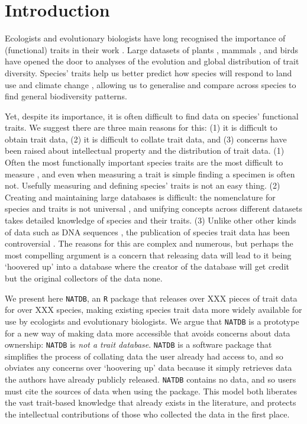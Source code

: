 \documentclass[12pt]{report}
\newcommand{\R}{\texttt{R}\xspace}
\newcommand{\natdb}{\texttt{NATDB}\xspace}
\begin{document}
\section{Introduction}
Ecologists and evolutionary biologists have long recognised the
importance of (functional) traits in their work
\autocite{Diaz2001}. Large datasets of plants \autocite{Kattge2011},
mammals \autocite{Jones2009}, and birds \autocite{Wilman2014} have
opened the door to analyses of the evolution \autocite{Harmon2010} and
global distribution \autocite{Kattge2011} of trait diversity.
Species' traits help us better predict how species will respond to
land use \autocite{Mayfield2010a} and climate change
\autocite{Estrada2016}, allowing us to generalise and compare across
species to find general biodiversity patterns. 

Yet, despite its importance, it is often difficult to find data on
species' functional traits. We suggest there are three main reasons for
this: (1) it is difficult to obtain trait data, (2) it is difficult to
collate trait data, and (3) concerns have been raised about
intellectual property and the distribution of trait data. (1) Often
the most functionally important species traits are the most difficult
to measure \autocite{Cornelissen2003,Violle2007}, and even when
measuring a trait is simple finding a specimen is often not. Usefully
measuring and defining species' traits is not an easy thing. (2)
Creating and maintaining large databases is difficult: the
nomenclature for species and traits is not universal
\autocite{Kattge2011,Hudson2017}, and unifying concepts across
different datasets takes detailed knowledge of species and their
traits. (3) Unlike other other kinds of data such as DNA sequences
\autocite{Benson2013}, the publication of species trait data has been
controversial \autocite[\emph{e.g.},][]{Poisot2014,Moles2013}.
The reasons for this are complex and numerous, but perhaps the most
compelling argument is a concern that releasing data will lead to it
being `hoovered up' into a database where the creator of the database
will get credit but the original collectors of the data none.

We present here \natdb, an \R package that releases over XXX pieces of
trait data for over XXX species, making existing species trait data
more widely available for use by ecologists and evolutionary
biologists. We argue that \natdb is a prototype for a new way of
making data more accessible that avoids concerns about data ownership:
\natdb is \emph{not a trait database}. \natdb is a software package
that simplifies the process of collating data the user already had
access to, and so obviates any concerns over `hoovering up' data
because it simply retrieves data the authors have already publicly
released. \natdb contains no data, and so users must cite the sources
of data when using the package. This model both liberates the vast
trait-based knowledge that already exists in the literature, and
protects the intellectual contributions of those who collected the
data in the first place.
\end{document}
